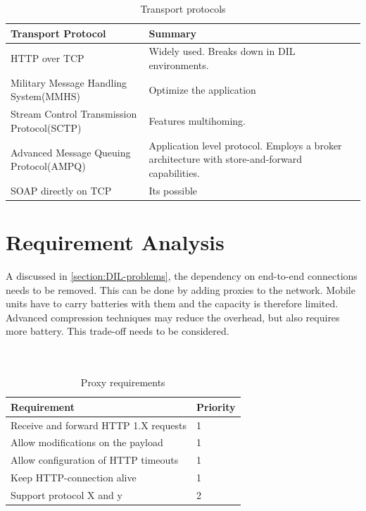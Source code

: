 \documentclass[USenglish]{ifimaster}
\begin{document}
\begin{table}[h]
\begin{tabularx}{\textwidth}{| X | X |}
\hline
  \textbf{Transport Protocol} & \textbf{Summary} \\ \hline
  HTTP over TCP & Widely used. Breaks down in DIL environments.\\ \hline
  Military Message Handling System(MMHS) & Optimize the application\\ \hline
  Stream Control Transmission Protocol(SCTP) & Features multihoming. \\ \hline
  Advanced Message Queuing Protocol(AMPQ) & Application level protocol. Employs
  a broker architecture with store-and-forward capabilities. \\ \hline
  SOAP directly on TCP & Its possible \\ \hline
\end{tabularx}
\caption{Transport protocols}
\end{table}





\section{Requirement Analysis}
A discussed in \cref{section:DIL-problems}, the dependency on end-to-end
connections needs to be removed. This can be done by adding proxies to the
network. Mobile units have to carry batteries with them and the capacity is
therefore limited. Advanced compression techniques may reduce the overhead, but
also requires more battery. This trade-off needs to be considered.
\\ \\ \\
\begin{table}[h]
\begin{tabular}{| l | l |}
\hline
  \textbf{Requirement} & \textbf{Priority} \\ \hline
  Receive and forward HTTP 1.X requests & 1\\ \hline
  Allow modifications on the payload & 1 \\ \hline
  Allow configuration of HTTP timeouts & 1 \\ \hline
  Keep HTTP-connection alive & 1 \\ \hline
  Support protocol X and y & 2 \\ \hline
\end{tabular}
\caption{Proxy requirements}
\end{table}
\end{document}
